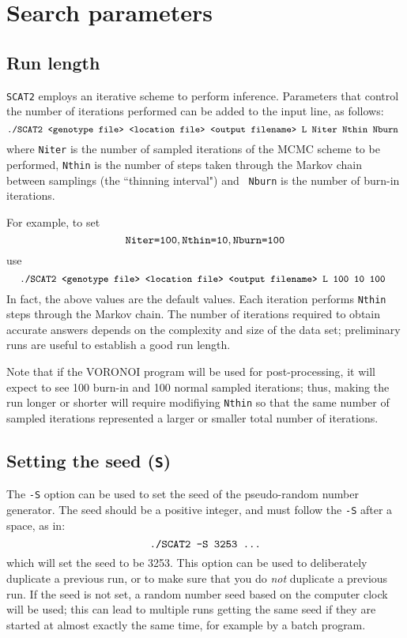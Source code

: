 \documentclass[10pt,titlepage,times,letterpaper]{article}
\def\SCAT{{\tt SCAT2} }
\begin{document}

\section{Search parameters} \label{HowLong}

\subsection{Run length}
\SCAT employs an iterative scheme to perform inference. 
Parameters that control the number of iterations performed
can be added to the input line, as follows:
$$\text{{\small \tt ./SCAT2 <genotype file> <location file> <output
filename> L Niter Nthin Nburn }}$$ where {\tt Niter} is the number
of sampled iterations of the MCMC scheme to be performed, {\tt Nthin} is the
number of steps taken through the Markov chain between samplings (the ``thinning interval") and {\tt
Nburn} is the number of burn-in iterations.

For example, to set
$$\text{{\tt Niter=100}}, \text{{\tt Nthin=10}}, \text{{\tt Nburn=100}}$$
use
$$\text{{\tt \small./SCAT2 <genotype file> <location file> <output
filename> L 100 10 100 }}$$ 
In fact, the above values are the
default values. Each iteration performs {\tt Nthin}
steps through the Markov chain.
The number of iterations required to obtain accurate answers depends
on the complexity and size of the data set; preliminary runs are useful
to establish a good run length.

Note that if the VORONOI program will be used for post-processing, it will
expect to see 100 burn-in and 100 normal sampled iterations; thus, making the
run longer or shorter will require modifiying {\tt Nthin} so that the same
number of sampled iterations represented a larger or smaller total number
of iterations.

\subsection{Setting the seed ({\tt S})} \label{Soption}

The {\tt -S} option can be used to set the seed of the
pseudo-random number generator. The seed should be a
positive integer, and must follow the {\tt -S} after a space, as in:
$$\text{{\tt ./SCAT2 -S 3253 ...}}$$
which will set the seed to be 3253. This option can be
used to deliberately duplicate a previous run, or to make sure 
that you do {\it not}
duplicate a previous run.  If the seed is not set, a 
random number seed based on the computer clock will be used;
this can lead to multiple runs getting the same seed if they are started
at almost exactly the same time, for example by a batch program.
\end{document}
